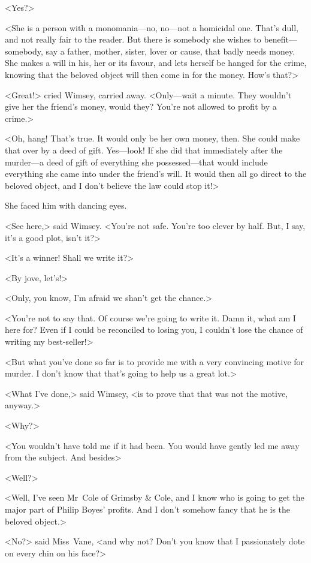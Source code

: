 <Yes?>

<She is a person with a monomania—no, no—not a homicidal one. That's dull, and not really fair to the reader. But there is somebody she wishes to benefit—somebody, say a father, mother, sister, lover or cause, that badly needs money. She makes a will in his, her or its favour, and lets herself be hanged for the crime, knowing that the beloved object will then come in for the money. How's that?>

<Great!> cried Wimsey, carried away. <Only—wait a minute. They wouldn't give her the friend's money, would they? You're not allowed to profit by a crime.>

<Oh, hang! That's true. It would only be her own money, then. She could make that over by a deed of gift. Yes—look! If she did that immediately after the murder—a deed of gift of everything she possessed—that would include everything she came into under the friend's will. It would then all go direct to the beloved object, and I don't believe the law could stop it!>

She faced him with dancing eyes.

<See here,> said Wimsey. <You're not safe. You're too clever by half. But, I say, it's a good plot, isn't it?>

<It's a winner! Shall we write it?>

<By jove, let's!>

<Only, you know, I'm afraid we shan't get the chance.>

<You're not to say that. Of course we're going to write it. Damn it, what am I here for? Even if I could be reconciled to losing you, I couldn't lose the chance of writing my best-seller!>

<But what you've done so far is to provide me with a very convincing motive for murder. I don't know that that's going to help us a great lot.>

<What I've done,> said Wimsey, <is to prove that that was not the motive, anyway.>

<Why?>

<You wouldn't have told me if it had been. You would have gently led me away from the subject. And besides\longdash>

<Well?>

<Well, I've seen Mr~Cole of Grimsby \& Cole, and I know who is going to get the major part of Philip Boyes' profits. And I don't somehow fancy that he is the beloved object.>

<No?> said Miss~Vane, <and why not? Don't you know that I passionately dote on every chin on his face?>

